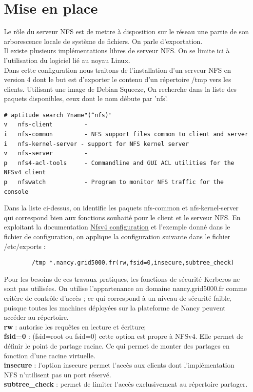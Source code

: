 \documentclass[12pt]{report}
\begin{document}
    \section{Mise en place}
Le rôle du serveur NFS est de mettre à disposition sur le réseau une partie de son arborescence locale de système de fichiers. On parle d'\og exportation\fg.\\
Il existe plusieurs implémentations libres de serveur NFS. On se limite ici à l'utilisation du logiciel lié au noyau Linux.\\
Dans cette configuration nous traitons de l'installation d'un serveur NFS en version 4 dont le but est d'exporter le contenu d'un répertoire /tmp vers les clients.
Utilisant une image de Debian Squeeze, On recherche dans la liste des paquets disponibles, ceux dont le nom débute par 'nfs'.
\begin{lstlisting}
# aptitude search ?name"(^nfs)"
v   nfs-client         -
i   nfs-common         - NFS support files common to client and server
i   nfs-kernel-server - support for NFS kernel server
v   nfs-server         -
p   nfs4-acl-tools     - Commandline and GUI ACL utilities for the NFSv4 client
p   nfswatch           - Program to monitor NFS traffic for the console
	  \end{lstlisting}
Dans la liste ci-dessus, on identifie les paquets nfs-common et nfs-kernel-server qui correspond bien aux fonctions souhaité pour le client et le serveur NFS.
En exploitant la documentation \href{https://wiki.linux-nfs.org/wiki/index.php/Nfsv4_configuration_fr}{Nfsv4 configuration} et l'exemple donné dans le fichier de configuration, on applique la configuration suivante dans le fichier /etc/exports :
    \begin{lstlisting}
	    /tmp *.nancy.grid5000.fr(rw,fsid=0,insecure,subtree_check)
	  \end{lstlisting}
Pour les besoins de ces travaux pratiques, les fonctions de sécurité Kerberos ne sont pas utilisées. On utilise l'appartenance au domaine nancy.grid5000.fr comme critère de contrôle d'accès ; ce qui correspond à un niveau de sécurité faible, puisque toutes les machines déployées sur la plateforme de Nancy peuvent accéder au répertoire.\\
	  \textbf{rw }: autorise les requêtes en lecture et écriture;\\
	  \textbf{fsid=0} : (fsid=root ou fsid=0) cette option est propre à NFSv4. Elle permet de définir le point de partage racine. Ce qui permet de monter des partages en fonction d'une racine virtuelle.\\
	  \textbf{insecure} : l'option insecure permet l'accès aux clients dont l'implémentation NFS n'utilisent pas un port réservé.\\
	  \textbf{subtree\_check} : permet de limiter l'accès exclusivement au répertoire partager.\\
	  
\end{document}
